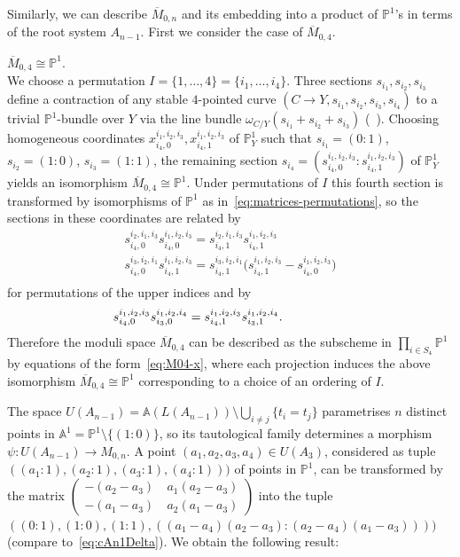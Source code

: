 \documentclass[ALCO,ThmDefs,Unicode,epreuves]{cedram}
\def\A{\mathds A}
\def\P{\mathds P}
\begin{document}
Similarly, we can describe $\overline{M}_{0,n}$ and its embedding into 
a product of $\P^1$'s in terms of the root system $A_{n-1}$. First we consider the 
case of $\overline{M}_{0,4}$.

\begin{exam}\label{ex:M04} $\overline{M}_{0,4}\cong\P^1$.\\ 
We choose a permutation $I=\{1,\ldots,4\}=\{i_1,\ldots,i_4\}$.
Three sections $s_{i_1},s_{i_2},s_{i_3}$ define a contraction of any stable 
$4$-pointed curve $(C\to Y,s_{i_1},s_{i_2},s_{i_3},s_{i_4})$ to a trivial 
$\P^1$-bundle over $Y$ via the line bundle $\omega_{C/Y}(s_{i_1}+s_{i_2}+s_{i_3})$
(\cf~\cite{Kn83}).
Choosing homogeneous coordinates $x^{i_1,i_2,i_3}_{i_4,0},x^{i_1,i_2,i_3}_{i_4,1}$
of $\P^1_Y$ such that $s_{i_1}=(0\!:\!1)$, $s_{i_2}=(1\!:\!0)$, $s_{i_3}=(1\!:\!1)$,
the remaining section $s_{i_4}=(s^{i_1,i_2,i_3}_{i_4,0}:s^{i_1,i_2,i_3}_{i_4,1})$ 
of $\P^1_Y$ yields an isomorphism $\overline{M}_{0,4}\cong\P^1$.
Under permutations of $I$ this fourth section is transformed by isomorphisms of $\P^1$ 
as in~\eqref{eq:matrices-permutations}, so the sections in these coordinates are related by
\begin{equation}\label{eq:M04-s3}
\begin{array}{l} 
s^{i_2,i_1,i_3}_{i_4,0}s^{i_1,i_2,i_3}_{i_4,0}
=s^{i_2,i_1,i_3}_{i_4,1}s^{i_1,i_2,i_3}_{i_4,1}\\
s^{i_3,i_2,i_1}_{i_4,0}s^{i_1,i_2,i_3}_{i_4,1}=
s^{i_3,i_2,i_1}_{i_4,1}\big(s^{i_1,i_2,i_3}_{i_4,1}-s^{i_1,i_2,i_3}_{i_4,0}\big)\\
\end{array}
\end{equation}
for permutations of the upper indices and by
\begin{equation}\label{eq:M04-s4}
s^{i_1,i_2,i_3}_{i_4,0}s^{i_1,i_2,i_4}_{i_3,0}
=s^{i_1,i_2,i_3}_{i_4,1}s^{i_1,i_2,i_4}_{i_3,1}.\hspace{1.84cm}
\end{equation}
Therefore the moduli space $\overline{M}_{0,4}$ can be described as the subscheme in
$\prod_{i\in S_4}\P^1$ by equations of the form~\eqref{eq:M04-x}, where each projection
induces the above isomorphism $\overline{M}_{0,4}\cong\P^1$ corresponding to a choice 
of an ordering of $I$.
\end{exam}

The space $U(A_{n-1})=\A(L(A_{n-1}))\setminus\bigcup_{i\neq j}\{t_i=t_j\}$
parametrises $n$ distinct points in $\A^1=\P^1\setminus\{(1:0)\}$, so its
tautological family determines a morphism $\psi\colon U(A_{n-1})\to M_{0,n}$.
A point $(a_1,a_2,a_3,a_4)\in U(A_3)$, considered as tuple
$((a_1:1),(a_2:1),(a_3:1),(a_4:1)))$ of points in $\P^1$, can be transformed by the
matrix $\left(\begin{smallmatrix}-(a_2-a_3)&\:a_1(a_2-a_3)\\-(a_1-a_3)&\:a_2(a_1-a_3)
\end{smallmatrix}\right)$ into the tuple $((0:1),(1:0),(1:1),
((a_1-a_4)(a_2-a_3):(a_2-a_4)(a_1-a_3))))$ (compare to~\eqref{eq:cAn1Delta}). 
We obtain the following result:
\end{document}
